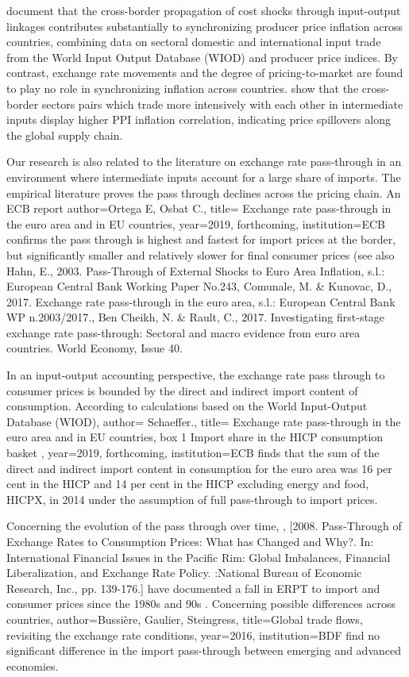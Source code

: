 \documentclass[11pt,a4paper]{article}
\begin{document}
\cite{Auer2017} document that the cross-border propagation of cost shocks through input-output
linkages contributes substantially to synchronizing producer price inflation across countries, combining data on sectoral domestic and international input trade from the World Input Output
Database (WIOD) and producer price indices. By contrast, exchange rate movements and the degree of pricing-to-market are found to play no role in synchronizing inflation across countries.
\cite{AntoundeAlmeida2016} show that the cross-border sectors pairs which trade more intensively with each other in intermediate inputs display higher PPI inflation correlation, indicating  price spillovers along the global supply chain.

Our research is also related to the literature on exchange rate pass-through in an environment where intermediate inputs account for a large share of imports. 
The empirical literature proves the pass through declines across the pricing chain. An ECB report \cite{ECB2019} author={Ortega E, Osbat C.}, title={ Exchange rate pass-through in the euro area and in EU countries}, year=2019, forthcoming, institution={ECB} confirms the pass through is highest and fastest for import prices at the border, but significantly smaller and relatively slower for final consumer prices (see also Hahn, E., 2003. Pass-Through of External Shocks to Euro Area Inflation, s.l.: European Central Bank Working Paper No.243, Comunale, M. & Kunovac, D., 2017. Exchange rate pass-through in the euro area, s.l.: European Central Bank WP n.2003/2017., Ben Cheikh, N. & Rault, C., 2017. Investigating first-stage exchange rate pass-through: Sectoral and macro evidence from euro area countries. World Economy, Issue 40.

In an input-output accounting perspective, the exchange rate pass through to consumer prices is bounded by the direct and indirect import content of consumption. According to calculations based on the World Input-Output Database (WIOD),  \cite{Schaeffer2019} author={ Schaeffer.}, title={ Exchange rate pass-through in the euro area and in EU countries, box 1 Import share in the HICP consumption basket }, year=2019, forthcoming, institution={ECB} finds that the sum of the direct and indirect import content in consumption for the euro area was 16 per cent in the HICP and 14 per cent in the HICP excluding energy and food, HICPX, in 2014 under the assumption of full pass-through to import prices.

Concerning the evolution of the pass through over time, \cite{Campa and Goldberg2019}, [2008. Pass-Through of Exchange Rates to Consumption Prices: What has Changed and Why?. In: International Financial Issues in the Pacific Rim: Global Imbalances, Financial Liberalization, and Exchange Rate Policy.  :National Bureau of Economic Research, Inc., pp. 139-176.] have documented a fall in ERPT to import and consumer prices since the 1980s and 90s . Concerning possible differences across countries, \cite{Bussière2016} author={Bussière, Gaulier, Steingress}, title={Global trade flows, revisiting the exchange rate conditions}, year=2016, institution={BDF}  find no significant difference in the import pass-through between emerging and advanced economies.
\end{document}
